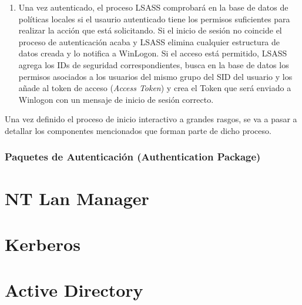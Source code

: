 \begin{enumerate}
\item Una vez autenticado, el proceso LSASS comprobará en la base de datos de políticas locales si el usaurio autenticado tiene los permisos suficientes para realizar la acción que está solicitando. Si el inicio de sesión no coincide el proceso de autenticación acaba y LSASS elimina cualquier estructura de datos creada y lo notifica a WinLogon. Si el acceso está permitido, LSASS agrega los IDs de seguridad correspondientes, busca en la base de datos los permisos asociados a los usuarios del mismo grupo del SID del usuario y los añade al token de acceso ({\it Access Token}) y crea el Token que será enviado a Winlogon con un mensaje de inicio de sesión correcto. 

\end{enumerate}

Una vez definido el proceso de inicio interactivo a grandes rasgos, se va a pasar a detallar los componentes mencionados que forman parte de dicho proceso.

\subsubsection{Paquetes de Autenticación (Authentication Package)}

\section{NT Lan Manager}

\section{Kerberos}

\section{Active Directory}


